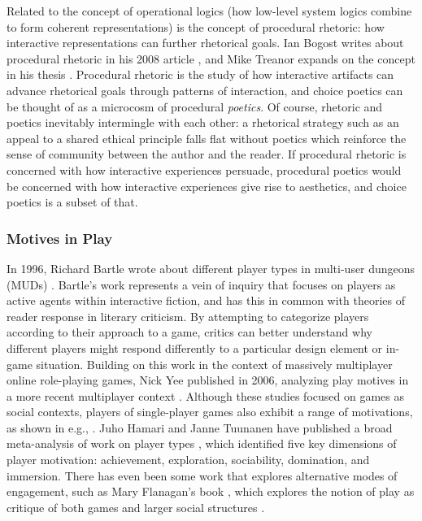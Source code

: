 Related to the concept of operational logics (how low-level system logics combine to form coherent representations) is the concept of procedural rhetoric: how interactive representations can further rhetorical goals.
%
Ian Bogost writes about procedural rhetoric in his 2008 article  \citep{Bogost2008}, and Mike Treanor expands on the concept in his thesis \citep{Treanor2013}.
%
Procedural rhetoric is the study of how interactive artifacts can advance rhetorical goals through patterns of interaction, and choice poetics can be thought of as a microcosm of procedural \emph{poetics}.
%
Of course, rhetoric and poetics inevitably intermingle with each other: a rhetorical strategy such as an appeal to a shared ethical principle falls flat without poetics which reinforce the sense of community between the author and the reader.
%
If procedural rhetoric is concerned with how interactive experiences persuade, procedural poetics would be concerned with how interactive experiences give rise to aesthetics, and choice poetics is a subset of that.


\subsubsection{Motives in Play}

In 1996, Richard Bartle wrote about different player types in multi-user dungeons (MUDs) \citep{Bartle1996}.
%
Bartle's work represents a vein of inquiry that focuses on players as active agents within interactive fiction, and has this in common with theories of reader response in literary criticism.
%
By attempting to categorize players according to their approach to a game, critics can better understand why different players might respond differently to a particular design element or in-game situation.
%
Building on this work in the context of massively multiplayer online role-playing games, Nick Yee published  in 2006, analyzing play motives in a more recent multiplayer context \citep{Yee2006}.
%
Although these studies focused on games as social contexts, players of single-player games also exhibit a range of motivations, as shown in e.g., \citep{Kallio2011}.
%
Juho Hamari and Janne Tuunanen have published a broad meta-analysis of work on player types \citep{Hamari2014}, which identified five key dimensions of player motivation: achievement, exploration, sociability, domination, and immersion.
%
There has even been some work that explores alternative modes of engagement, such as Mary Flanagan's book , which explores the notion of play as critique of both games and larger social structures \citep{Flanagan2009}.


